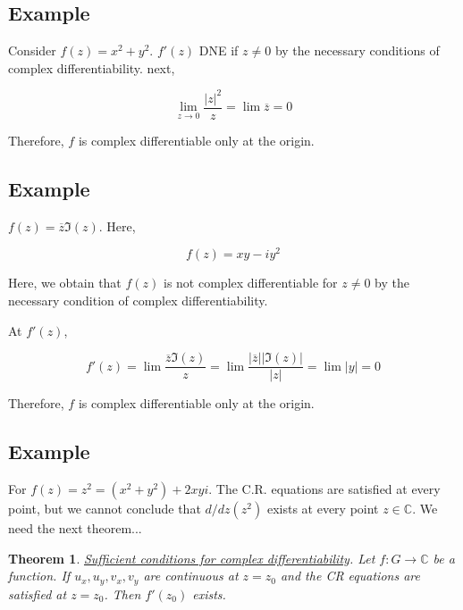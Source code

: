\documentclass{article}
\newtheorem{theorem}{Theorem}[section]
\newtheorem{one minute paper}[theorem]{One Minute Paper}
\begin{document}
\subsection*{Example}

Consider $f(z) = x^2 + y^2$. $f'(z)$ DNE if $z \neq 0$ by the necessary conditions of complex differentiability. next, 

\begin{equation}
    \lim_{z \rightarrow 0}\frac{|z|^2}{z} = \lim \overline{z} = 0
\end{equation}

Therefore, $f$ is complex differentiable only at the origin. 

\subsection*{Example}

$f(z) = \overline{z}\Im(z)$. Here, 

\begin{equation}
    f(z) = xy - iy^2
\end{equation}

Here, we obtain that $f(z)$ is not complex differentiable for $z \neq 0$ by the necessary condition of complex differentiability. 

At $f'(z)$, 

\begin{equation}
    f'(z) = \lim \frac{\overline{z}\Im(z)}{z} = \lim \frac{|\overline{z}| |\Im(z)|}{|z|} = \lim |y| = 0
\end{equation}

Therefore, $f$ is complex differentiable only at the origin. 

\subsection*{Example}

For $f(z) = z^2 = (x^2 + y^2) + 2xy i$. The C.R. equations are satisfied at every point, but we cannot conclude that $d/dz (z^2)$ exists at every point $z \in \mathbb{C}$. We need the next theorem... 

\begin{theorem}
    \underline{Sufficient conditions for complex differentiability}. Let $f: G \rightarrow \mathbb{C}$ be a function. If $u_x,u_y,v_x,v_y$ are continuous at $z = z_0$ and the CR equations 
    are satisfied at $z = z_0$. Then $f'(z_0)$ exists.
\end{theorem}
\end{document}
